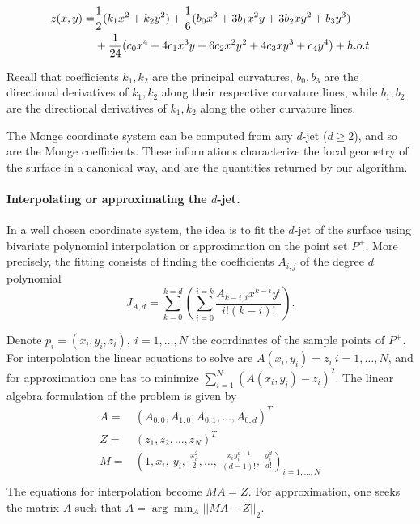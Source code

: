 \begin{eqnarray}
\label{eq:monge}
z(x,y) =  & \frac{1}{2}(k_1x^2 + k_2y^2)+
	\frac{1}{6}(b_0x^3+3b_1x^2y+3b_2xy^2+b_3y^3) \\
  &  +\frac{1}{24}(c_0x^4+4c_1x^3y+6c_2x^2y^2+4c_3xy^3+c_4y^4) + h.o.t
\end{eqnarray}

Recall that coefficients $k_1, k_2$ are the principal curvatures,
$b_0,b_3$ are the directional derivatives of $k_1,k_2$ along their
respective curvature lines, while $b_1,b_2$ are the directional
derivatives of $k_1,k_2$ along the other curvature lines.

The Monge coordinate system can be computed from any $d$-jet ($d\geq
2$), and so are the Monge coefficients. These informations
characterize the local geometry of the surface in a canonical way, and
are the quantities returned by our algorithm.

\paragraph{Interpolating or approximating the $d$-jet.}
%
In a well chosen coordinate system, the idea is to fit the $d$-jet of
the surface using bivariate polynomial interpolation or approximation
on the point set $P^+$.
%
More precisely, the fitting consists of finding the coefficients
$A_{i,j}$ of the degree $d$ polynomial 
\begin{equation}
\label{eq-answer}
J_{A,d}= \sum_{k=0}^{k=d}(\sum_{i=0}^{i=k}
\frac{A_{k-i,i}x^{k-i}y^{i}}{i!(k-i)!}).
\end{equation}


Denote $p_i=(x_i,y_i,z_i), \ i=1,\ldots , N$ the coordinates of the
sample points of $P^+$.
For interpolation the linear equations to solve are $A(x_i,y_i)=z_i \
i=1,\ldots,N$, and for approximation one has to minimize $\sum_{i=1}^N
(A(x_i,y_i)-z_i)^2$. The linear algebra formulation of the problem is
given by
%
\begin{eqnarray}
\label{eq:fit-linalg}
 A =  & (A_{0,0}, A_{1,0},A_{0,1}, \ldots , A_{0,d})^T \\ 
 Z=  &(z_1, z_2,\ldots , z_N)^T \\ 
 M=  &(1,x_i,\ y_i,\ \frac{x_i^2}{2},\ldots ,
\ \frac{x_iy_i^{d-1}}{(d-1)!},\ \frac{y_i^d}{d!})_{i=1,...,N}\\
\end{eqnarray}
%
The equations for interpolation become $MA=Z$. For approximation, one
seeks the matrix $A$ such that $A = \arg \min_A  ||MA-Z||_2$.

